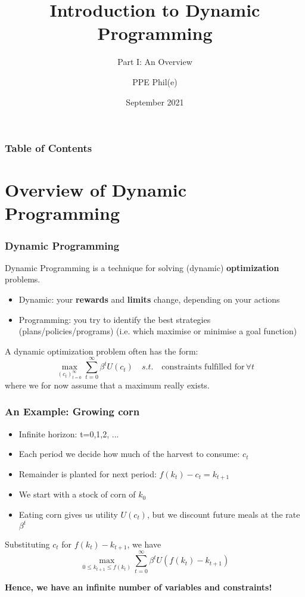 \documentclass[aspectratio=169]{beamer}
\title[Dynamic Programming Part I] %
{Introduction to Dynamic Programming}
\subtitle{Part I: An Overview}
\author[PPE Phil(e)]
{PPE Phil(e)\inst{1}}
\institute[] %
{
  \inst{1}%
  material @ https://github.com/PPEphile
}
\date[2021] %
{September 2021}
\begin{document}
\frame{\titlepage}

\begin{frame}
\frametitle{Table of Contents}
\tableofcontents
\end{frame}

\section{Overview of Dynamic Programming}

\begin{frame}
\frametitle{Dynamic Programming}
Dynamic Programming is a technique for solving (dynamic) \textbf{optimization} problems.

\begin{itemize}
	\item Dynamic: your \textbf{rewards} and \textbf{limits} change, depending on your actions
	\item Programming: you try to identify the best strategies (plans/policies/programs) (i.e. which maximise or minimise a goal function)
\end{itemize}


A dynamic optimization problem often has the form:
\begin{equation}
	\max_{(c_t)^{\infty}_{t=0}} \sum^{\infty}_{t=0} \beta^t U(c_t) \quad s.t. \quad \textrm{constraints fulfilled for} \, \forall t
\end{equation}
where we for now assume that a maximum really exists.
\end{frame}

\begin{frame}
\frametitle{An Example: Growing corn}
\begin{itemize}
	\item Infinite horizon: t=0,1,2, ...
	\item Each period we decide how much of the harvest to consume: $c_t$
	\item Remainder is planted for next period: $f(k_t)-c_t=k_{t+1}$
	\item We start with a stock of corn of $k_0$
	\item Eating corn gives us utility $U(c_t)$, but we discount future meals at the rate $\beta^t$
\end{itemize}

Substituting $c_t$ for $f(k_t) - k_{t+1}$, we have
\begin{equation}
	\max_{0 \leq k_{t+1} \leq f(k_t)} \sum^{\infty}_{t=0} \beta^t U(f(k_t) - k_{t+1})
\end{equation}

\color{red}\textbf{Hence, we have an infinite number of variables and constraints!}
\end{frame}
\end{document}
